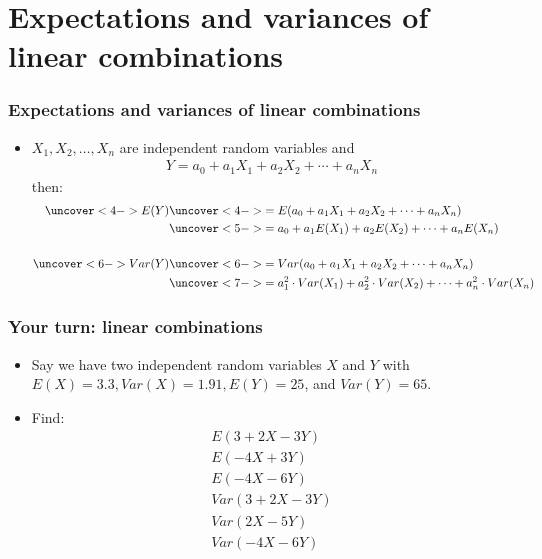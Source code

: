 \documentclass[handout]{beamer}\usepackage{graphicx, color}
\numberwithin{equation}{section}
\begin{document}
\section{Expectations and variances of linear combinations}


\begin{frame}
\frametitle{Expectations and variances of linear combinations}
\begin{itemize}
\pause \item $X_1, X_2, \ldots, X_n$ are independent random variables and
\pause \begin{align*}
Y = a_0 + a_1 X_1 + a_2 X_2 + \cdots + a_n X_n
\end{align*} 
\pause then:
\begin{align*}
\uncover<4->{E(Y)} & \uncover<4->{= E(a_0 + a_1 X_1 + a_2 X_2 + \cdots + a_n X_n)} \\
&\uncover<5->{= a_0 + a_1 E(X_1) + a_2 E(X_2) + \cdots + a_n E(X_n)} \\ \\
\uncover<6->{Var(Y)} & \uncover<6->{= Var(a_0 + a_1 X_1 + a_2 X_2 + \cdots + a_n X_n)} \\
&\uncover<7->{= a_1^2 \cdot Var(X_1) + a_2^2  \cdot Var(X_2) + \cdots + a_n^2 \cdot Var(X_n)}
\end{align*}
\end{itemize}
\end{frame}



\begin{frame}
\frametitle{Your turn: linear combinations}
\begin{itemize}
\item Say we have two independent random variables $X$ and $Y$ with $E(X) = 3.3, Var(X) = 1.91, E(Y) = 25$, and $Var(Y) = 65$.
\item Find:
\begin{align*}
E(3 + 2X - 3Y) \\
E(-4 X + 3Y) \\
E(-4X - 6Y) \\
Var(3 + 2X - 3Y) \\ 
Var(2X - 5Y) \\
Var(-4X - 6Y)  
\end{align*}
\end{itemize}
\end{frame}
\end{document}
